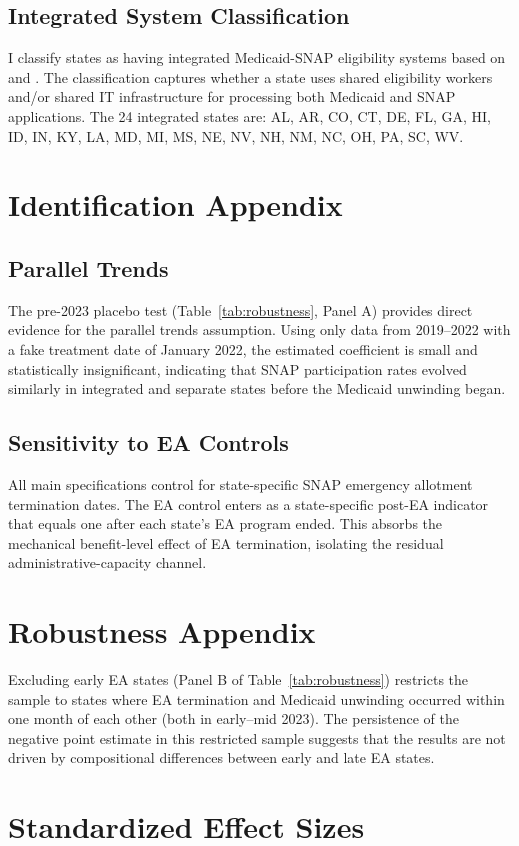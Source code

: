 \documentclass[12pt]{article}
\begin{document}
\subsection{Integrated System Classification}

I classify states as having integrated Medicaid-SNAP eligibility systems based on \citet{clasp2023} and \citet{kff2023unwinding}. The classification captures whether a state uses shared eligibility workers and/or shared IT infrastructure for processing both Medicaid and SNAP applications. The 24 integrated states are: AL, AR, CO, CT, DE, FL, GA, HI, ID, IN, KY, LA, MD, MI, MS, NE, NV, NH, NM, NC, OH, PA, SC, WV.

\section{Identification Appendix}

\subsection{Parallel Trends}

The pre-2023 placebo test (Table~\ref{tab:robustness}, Panel A) provides direct evidence for the parallel trends assumption. Using only data from 2019--2022 with a fake treatment date of January 2022, the estimated coefficient is small and statistically insignificant, indicating that SNAP participation rates evolved similarly in integrated and separate states before the Medicaid unwinding began.

\subsection{Sensitivity to EA Controls}

All main specifications control for state-specific SNAP emergency allotment termination dates. The EA control enters as a state-specific post-EA indicator that equals one after each state's EA program ended. This absorbs the mechanical benefit-level effect of EA termination, isolating the residual administrative-capacity channel.

\section{Robustness Appendix}

Excluding early EA states (Panel B of Table~\ref{tab:robustness}) restricts the sample to states where EA termination and Medicaid unwinding occurred within one month of each other (both in early--mid 2023). The persistence of the negative point estimate in this restricted sample suggests that the results are not driven by compositional differences between early and late EA states.

\section{Standardized Effect Sizes}
\label{sec:sde}


\end{document}

